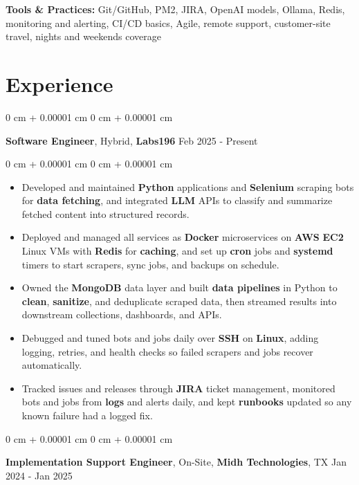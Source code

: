 \documentclass[10pt, letterpaper]{article}
\newenvironment{highlights}{
    \begin{itemize}[
        topsep=0.02 cm,
        parsep=0.02 cm,
        partopsep=0pt,
        itemsep=0pt,
        leftmargin=0 cm + 10pt
    ]
}{
    \end{itemize}
} %
\newenvironment{onecolentry}{
    \begin{adjustwidth}{
        0 cm + 0.00001 cm
    }{
        0 cm + 0.00001 cm
    }
}{
    \end{adjustwidth}
} %
\newcommand{\resumeheading}[2]{%
    \begin{onecolentry}
        #1 \hfill #2
    \end{onecolentry}
} %
\begin{document}
\vspace{0.12em}

\textbf{Tools \& Practices:}
Git/GitHub, PM2, JIRA, OpenAI models, Ollama, Redis, monitoring and alerting, CI/CD basics, Agile, remote support, customer-site travel, nights and weekends coverage



\section{Experience}

\resumeheading{\textbf{Software Engineer}, Hybrid, \textbf{Labs196}}{Feb 2025 - Present}

\begin{onecolentry}
\begin{highlights}
	\item Developed and maintained \textbf{Python} applications and \textbf{Selenium} scraping bots for \textbf{data fetching}, and integrated \textbf{LLM} APIs to classify and summarize fetched content into structured records.
	\item Deployed and managed all services as \textbf{Docker} microservices on \textbf{AWS} \textbf{EC2} Linux VMs with \textbf{Redis} for \textbf{caching}, and set up \textbf{cron} jobs and \textbf{systemd} timers to start scrapers, sync jobs, and backups on schedule.
	\item Owned the \textbf{MongoDB} data layer and built \textbf{data pipelines} in Python to \textbf{clean}, \textbf{sanitize}, and deduplicate scraped data, then streamed results into downstream collections, dashboards, and APIs.
	\item Debugged and tuned bots and jobs daily over \textbf{SSH} on \textbf{Linux}, adding logging, retries, and health checks so failed scrapers and jobs recover automatically.
	\item Tracked issues and releases through \textbf{JIRA} ticket management, monitored bots and jobs from \textbf{logs} and alerts daily, and kept \textbf{runbooks} updated so any known failure had a logged fix.
\end{highlights}
\end{onecolentry}


\vspace{0.04 cm}
\resumeheading{\textbf{Implementation Support Engineer}, On-Site, \textbf{Midh Technologies}, TX}{Jan 2024 - Jan 2025}
\end{document}

